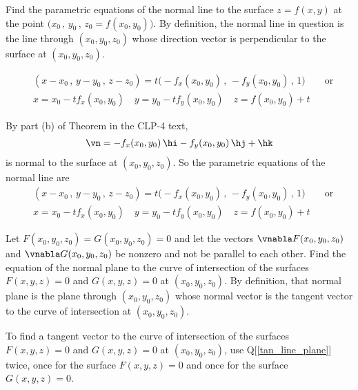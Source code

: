 \begin{question}
Find the parametric equations of the normal line to the surface 
$z=f(x,y)$ at the point $\big(x_0\,,\,y_0\,,\,z_0\!=\!f(x_0,y_0)\big)$. 
By definition, the normal line in question is the line through $(x_0,y_0,z_0)$ 
whose direction vector is perpendicular to the surface at $(x_0,y_0,z_0)$.
\end{question}


\begin{answer}
\begin{align*}
&(x-x_0\,,\,y-y_0\,,\,z-z_0) 
      = t\big(-f_x(x_0,y_0)\,,\,- f_y(x_0,y_0)\,,\, 1\big) 
\qquad\text{or}\\
&x=x_0-tf_x(x_0,y_0)\quad
y=y_0-tf_y(x_0,y_0)\quad
z=f(x_0,y_0)+t
\end{align*}
\end{answer}

\begin{solution}
By part (b) of Theorem  in the CLP-4 text,
\begin{align*}
\vn =-f_x(x_0,y_0)\,\hi - f_y(x_0,y_0)\,\hj + \hk
\end{align*}
is normal to the surface at $(x_0,y_0,z_0)$. So the parametric equations of the
normal line are
\begin{align*}
&(x-x_0\,,\,y-y_0\,,\,z-z_0) 
      = t\big(-f_x(x_0,y_0)\,,\,- f_y(x_0,y_0)\,,\, 1\big) 
\qquad\text{or}\\
&x=x_0-tf_x(x_0,y_0)\quad
y=y_0-tf_y(x_0,y_0)\quad
z=f(x_0,y_0)+t
\end{align*}
\end{solution}

\begin{question}
Let $F(x_0,y_0,z_0)=G(x_0,y_0,z_0)=0$ and let the vectors
$\vnabla F(x_0,y_0,z_0)$ and $\vnabla G(x_0,y_0,z_0)$ be nonzero and not
be parallel to each other. Find the equation of the normal plane to the 
curve of intersection of the surfaces $F(x,y,z)=0$ and $G(x,y,z)=0$ at
$(x_0,y_0,z_0)$. By definition, that normal plane is the plane through
$(x_0,y_0,z_0)$ whose normal vector is the tangent vector to the curve of
intersection at $(x_0,y_0,z_0)$. 
\end{question}

\begin{hint}
To find a tangent vector to the curve of intersection of the 
surfaces $F(x,y,z)=0$ and $G(x,y,z)=0$ at $(x_0,y_0,z_0)$,
use Q[\ref{tan_line_plane}] twice, once for the surface $F(x,y,z)=0$ and
once for the surface $G(x,y,z)=0$.
\end{hint}


